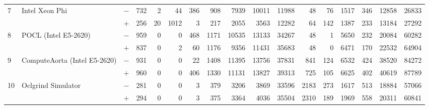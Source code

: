 \begin{tabular}{lll | rrrrrrr | rrrrrrr }
\hline
\multirow{ 2}{*}{7} & \multirow{ 2}{*}{Intel Xeon Phi} & $-$ & 732 & 2 & 44 & 386 & 908 & 7939 & 10011       & 11988 & 48 & 76 & 1517 & 346 & 12858 & 26833 \\& & $+$ & 256 & 20 & 1012 & 3 & 217 & 2055 & 3563 & 12282 & 64 & 142 & 1387 & 233 & 13184 & 27292 \\
\hline
\multirow{ 2}{*}{8} & \multirow{ 2}{*}{POCL (Intel E5-2620)} & $-$ & 959 & 0 & 0 & 468 & 1171 & 10535 & 13133       & 34267 & 48 & 1 & 5650 & 232 & 20084 & 60282 \\& & $+$ & 837 & 0 & 2 & 60 & 1176 & 9356 & 11431 & 35683 & 48 & 0 & 6471 & 170 & 22532 & 64904 \\
\hline
\multirow{ 2}{*}{9} & \multirow{ 2}{*}{ComputeAorta (Intel E5-2620)} & $-$ & 931 & 0 & 0 & 22 & 1408 & 11395 & 13756       & 37831 & 841 & 124 & 6532 & 424 & 38520 & 84272 \\& & $+$ & 960 & 0 & 0 & 406 & 1330 & 11131 & 13827 & 39313 & 725 & 105 & 6625 & 402 & 40619 & 87789 \\
\hline
\multirow{ 2}{*}{10} & \multirow{ 2}{*}{Oclgrind Simulator} & $-$ & 281 & 0 & 0 & 3 & 379 & 3206 & 3869       & 33596 & 2183 & 273 & 1617 & 513 & 18884 & 57066 \\& & $+$ & 294 & 0 & 0 & 3 & 375 & 3364 & 4036 & 35504 & 2310 & 189 & 1969 & 558 & 20311 & 60841 \\
  \bottomrule
\end{tabular}

